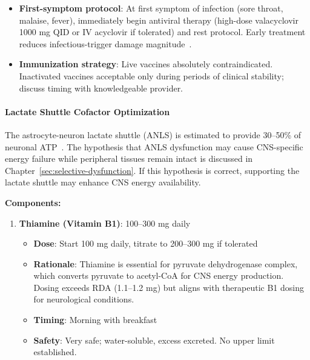 \begin{protocol}
\begin{itemize}
    \item \textbf{First-symptom protocol}: At first symptom of infection (sore throat, malaise, fever), immediately begin antiviral therapy (high-dose valacyclovir 1000 mg QID or IV acyclovir if tolerated) and rest protocol. Early treatment reduces infectious-trigger damage magnitude~\cite{NIH2024MECFSRoadmap}.

    \item \textbf{Immunization strategy}: Live vaccines absolutely contraindicated. Inactivated vaccines acceptable only during periods of clinical stability; discuss timing with knowledgeable provider.
\end{itemize}

\paragraph{Lactate Shuttle Cofactor Optimization}

\begin{keypoint}
The astrocyte-neuron lactate shuttle (ANLS) is estimated to provide 30--50\% of neuronal ATP~\cite{Pellerin1994}. The hypothesis that ANLS dysfunction may cause CNS-specific energy failure while peripheral tissues remain intact is discussed in Chapter~\ref{sec:selective-dysfunction}. If this hypothesis is correct, supporting the lactate shuttle may enhance CNS energy availability.
\end{keypoint}

\begin{recommendation}
\label{rec:lactate-shuttle-severe}

\textbf{Components:}

\begin{enumerate}
    \item \textbf{Thiamine (Vitamin B1)}: 100--300 mg daily
    \begin{itemize}
        \item \textbf{Dose}: Start 100 mg daily, titrate to 200--300 mg if tolerated
        \item \textbf{Rationale}: Thiamine is essential for pyruvate dehydrogenase complex, which converts pyruvate to acetyl-CoA for CNS energy production. Dosing exceeds RDA (1.1--1.2 mg) but aligns with therapeutic B1 dosing for neurological conditions.
        \item \textbf{Timing}: Morning with breakfast
        \item \textbf{Safety}: Very safe; water-soluble, excess excreted. No upper limit established.
    \end{itemize}


\end{enumerate}
\end{recommendation}
\end{protocol}
